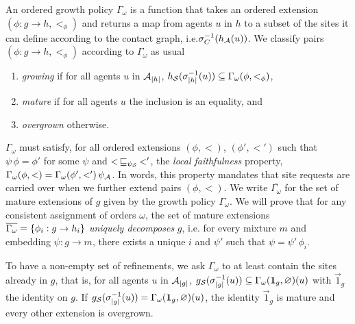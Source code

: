 \documentclass[a4paper,12pt]{article}
\newcommand{\ie}{i.e.\xspace}
\newcommand{\anon}[1]{\left|#1\right|}
\newcommand{\gp}{\Gamma}
\newcommand{\id}{\vec{1}}
\newcommand{\rfns}[1]{\overline{#1}}
\newcommand{\ord}{\omega}
\newcommand{\ogp}{\gp_\ord}
\begin{document}

An ordered growth policy $\ogp$ is a function
that takes an ordered extension $(\phi: g \to h, <_\phi)$
and returns a map from agents $u$ in $h$
to a subset of the sites it can define
according to the contact graph,
\ie $\sigma^{-1}_C(h_{\mathcal{A}}(u))$.
We classify pairs $(\phi: g \to h, <_\phi)$ according to $\ogp$ as usual
\begin{enumerate}[label={(\roman*)}]
\item \emph{growing} if for all agents $u$ in $\agents_{\anon{h}}$,
  $h_\sites(\sitemap^{-1}_{\anon{h}}(u)) \subseteq \ogp(\phi, <_\phi)$,
\item \emph{mature} if for all agents $u$
  the inclusion is an equality, and
\item \emph{overgrown} otherwise.
\end{enumerate}
$\ogp$ must satisfy,
for all ordered extensions $(\phi, <)$, $(\phi', <')$
such that $\psi \, \phi = \phi'$ for some $\psi$
and $< \,\sqsubseteq_{\psi_{\mathcal{S}}}\, <'$,
the \emph{local faithfulness} property,
$\ogp(\phi, <) = \ogp(\phi', {<'}) \, \psi_\agents$.
In words, this property mandates that site requests
are carried over when we further extend pairs $(\phi, <)$.
%
%
We write $\rfns{\ogp}$ for the set of mature extensions of $g$
given by the growth policy $\ogp$. %
We will prove that
for any consistent assignment of orders $\omega$, %
the set of mature extensions $\rfns{\ogp} = \set{\phi_i: g \to h_i}$
\emph{uniquely decomposes} $g$,
\ie for every mixture $m$ and embedding $\psi: g \to m$,
there exists a unique $i$ and $\psi'$
such that $\psi = \psi' \, \phi_i$.

To have a non-empty set of refinements,
we ask $\ogp$ to at least contain the sites already in $g$,
that is, for all agents $u$ in $\agents_{\anon{g}}$,
$g_\sites(\sitemap_{\anon{g}}^{-1}(u)) \subseteq
\ogp(\id_g, \varnothing)(u)$
with $\id_g$ the identity on $g$.
If $g_\sites(\sitemap_{\anon{g}}^{-1}(u)) =
\ogp(\id_g, \varnothing)(u)$,
the identity $\id_g$ is mature
and every other extension is overgrown.
\end{document}
